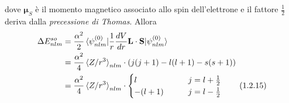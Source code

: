 \documentclass{article}
\begin{document}
dove $\boldsymbol{\mu}_S$ è il momento magnetico associato allo spin dell'elettrone e il fattore $\frac{1}{2}$ deriva dalla \textit{precessione di Thomas}. Allora 
\begin{align}
    \Delta E^{so}_{nlm} &= \frac{\alpha^2}{2}\braket{\psi^{(0)}_{nlm}|\frac{1}{r}\frac{dV}{dr}\mathbf{L} \cdot \mathbf{S}|\psi^{(0)}_{nlm}} \notag \\
    &= \frac{\alpha^2}{4}\braket{Z/r^3}_{nlm} \cdot (j(j + 1) - l(l + 1) - s(s + 1)) \notag \\
    &= \frac{\alpha^2}{4}\braket{Z/r^3}_{nlm} \cdot \begin{cases}
        l \qquad &j = l + \frac{1}{2} \\
        -(l + 1) \qquad &j = l - \frac{1}{2}
    \end{cases} \tag{1.2.15}
\end{align}
\end{document}
